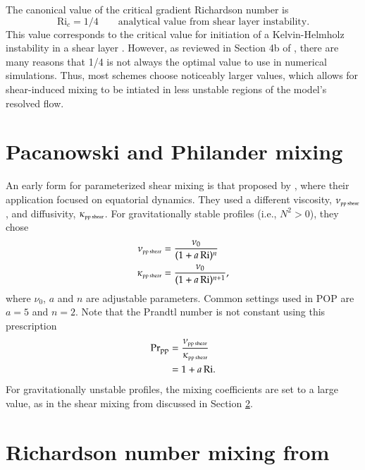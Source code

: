 The canonical value of the critical gradient Richardson number is
\begin{equation}
 \mbox{Ri}_{c} =1/4   \qquad \mbox{analytical value from shear layer instability.} 
\end{equation}
This value corresponds to the critical value for initiation of a
Kelvin-Helmholz instability in a shear layer \citep{miles1961}.
However, as reviewed in Section 4b of \cite{Jacksonetal2008}, there
are many reasons that 1/4 is not always the optimal value to use in
numerical simulations.  Thus, most schemes choose noticeably larger
values, which allows for shear-induced mixing to be intiated in less
unstable regions of the model's resolved flow.


\section{Pacanowski and Philander mixing}
\label{section:shear-instability-parameterized-ppvmix}

An early form for parameterized shear mixing is that proposed by
\cite{PPvmix}, where their application focused on equatorial dynamics.
They used a different viscosity, $\nu_{\mbox{\tiny pp shear}}$, and
diffusivity, $\kappa_{\mbox{\tiny pp shear}}$.  For gravitationally
stable profiles (i.e., $N^{2} > 0$), they chose
\begin{align}
 \nu_{\mbox{\tiny pp shear}}&= \frac{\nu_{0}}{(1 + a  \, \mbox{Ri})^{n}} 
\\
 \kappa_{\mbox{\tiny pp shear}}&= \frac{\nu_{0}}{(1 + a  \, \mbox{Ri})^{n+1}}, 
\end{align}
where $\nu_{0}$, $a$ and $n$ are adjustable parameters.  Common
settings used in POP are $a=5$ and $n=2$.  Note that the Prandtl
number is not constant using this prescription
\begin{subequations}
\begin{align}
  \mbox{Pr}_{\mbox{\scriptsize pp}} &= \frac{\nu_{\mbox{\tiny pp shear}}}{\kappa_{\mbox{\tiny pp  shear}}} 
 \\
 &= 1 + a  \, \mbox{Ri}.
\end{align}
\end{subequations}
For gravitationally unstable profiles, the mixing coefficients are set
to a large value, as in the shear mixing from \cite{LargeKPP}
discussed in Section
\ref{section:shear-instability-parameterized-kpp}.


\section{Richardson number mixing from \cite{LargeKPP}}
\label{section:shear-instability-parameterized-kpp}

